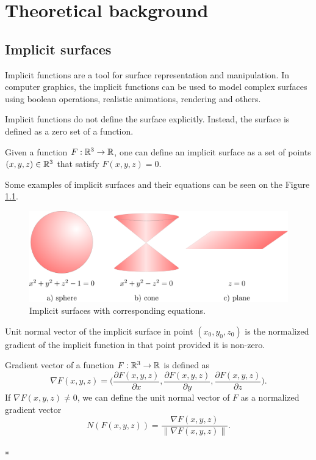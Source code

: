 \chapter{Theoretical background}
\label{chap1} %

\section{Implicit surfaces}
\label{sub2.1}

Implicit functions are a tool for surface representation and manipulation.
In computer graphics, the implicit functions can be used to model complex surfaces
using boolean operations, realistic animations, rendering and others.

Implicit functions do not define the surface explicitly. Instead,
the surface is defined as a zero set of a function.
\begin{definition}
    Given a function $F: \mathbb{R}^3 \to \mathbb{R}$, one can define an implicit surface
    as a set of points $(x, y, z)\in \mathbb{R}^3$ that satisfy $F(x, y, z) = 0$.
\end{definition}

Some examples of implicit surfaces and their equations can be seen on
the Figure \ref{img:1}.

\begin{figure}
    \centerline{\includegraphics[scale=0.5]{images/img1}}
    \caption[Implicit surfaces with corresponding equations]
    {Implicit surfaces with corresponding equations.}
    \label{img:1}
\end{figure}

Unit normal vector of the implicit surface in point $(x_0, y_0, z_0)$ is
the normalized gradient of the implicit function in that point provided it is
non-zero.

\begin{definition}
    Gradient vector of a function $F:\mathbb{R}^3 \to \mathbb{R}$ is defined as 
    $$\nabla F(x, y, z) = \bigg(\frac{\partial F(x, y, z)}{\partial x}, \frac{\partial F(x, y, z)}{\partial y}, 
    \frac{\partial F(x, y, z)}{\partial z}\bigg).$$
    If $\nabla F(x,y,z) \neq 0$, we can define the unit normal vector of $F$ as 
    a normalized gradient vector
    $$N(F(x, y, z))  = \frac{\nabla F(x, y, z)}{\| \nabla F(x, y, z) \|}.$$
    \\*
\end{definition}

